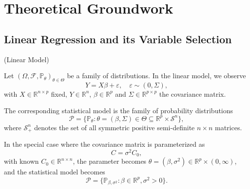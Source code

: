 \section{Theoretical Groundwork}
\label{sec:theoretical-groundwork}


\subsection{Linear Regression and its Variable Selection}

\begin{defn}{(Linear Model)}

Let $(\Omega, \mathcal{F}, \mathbb{P}_\theta)_{\theta \in \Theta}$ be a family of distributions. In the linear model, we observe
\[ Y = X\beta + \varepsilon, \quad \varepsilon \sim (0, \Sigma), \]
with $X \in \mathbb{R}^{n \times p}$ fixed, $Y \in \mathbb{R}^n$, $\beta \in \mathbb{R}^p$ and $\Sigma \in \mathbb{R}^{p\times p}$ the covariance matrix.

The corresponding statistical model is the family of probability distributions
\[
\mathcal{P} = \{ \mathbb{P}_\theta : \theta = (\beta, \Sigma) \in \Theta \subseteq \mathbb{R}^p \times \mathcal{S}^n \},
\]
where \( \mathcal{S}_{+}^n \) denotes the set of all symmetric positive semi-definite \( n \times n \) matrices.
\end{defn}

In the special case where the covariance matrix is parameterized as
\[
C = \sigma^2 C_0,
\]
with known \( C_0 \in \mathbb{R}^{n \times n} \), the parameter becomes \( \theta = (\beta, \sigma^2) \in \mathbb{R}^p \times (0, \infty) \), and the statistical model becomes
\[
\mathcal{P} = \{ \mathbb{P}_{\beta, \sigma^2} : \beta \in \mathbb{R}^p, \sigma^2 > 0 \}.
\]

